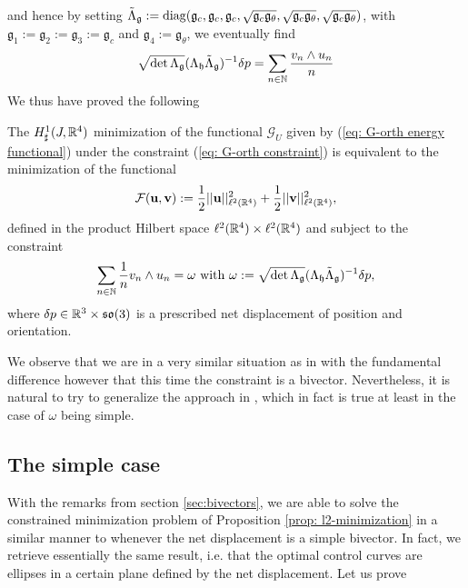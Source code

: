 and hence by setting $\tilde{\Lambda}_{\mathfrak{g}} := \operatorname{diag}(\mathfrak{g}_c, \mathfrak{g}_c, \mathfrak{g}_c, \sqrt{\mathfrak{g}_c \mathfrak{g}_{\theta}}, \sqrt{\mathfrak{g}_c \mathfrak{g}_{\theta}}, \sqrt{\mathfrak{g}_c  \mathfrak{g}_{\theta}})$, with $\mathfrak{g}_1 :=\mathfrak{g}_2 := \mathfrak{g}_3 := \mathfrak{g}_c$ and $\mathfrak{g}_4 := \mathfrak{g}_\theta$, we eventually find
\begin{equation}
\sqrt{\det \Lambda_{\mathfrak{g}}} (\Lambda_{\mathfrak{h}} \tilde{\Lambda}_{\mathfrak{g}})^{-1} \delta p = \sum_{n \in \mathbb{N}} \frac{v_n  \wedge u_n}{n}
\end{equation}
We thus have proved the following

\begin{proposition}
\label{prop: l2-minimization}
The $H_{\sharp}^1(J, \mathbb{R}^4)$ minimization of the functional $\mathcal{G}_U$ given by (\ref{eq: G-orth energy functional}) under the constraint (\ref{eq: G-orth constraint}) is equivalent to the minimization of the functional
\begin{equation}
\label{eq:l2-energy}
	\mathcal{F}(\mathbf{u}, \mathbf{v}) := \frac{1}{2} ||\mathbf{u} ||^2_{\ell^2(\mathbb{R}^4)} + \frac{1}{2} ||\mathbf{v}||^2_{\ell^2(\mathbb{R}^4)},
\end{equation}
defined in the product Hilbert space $\ell^2(\mathbb{R}^4) \times \ell^2(\mathbb{R}^4)$ and subject to the constraint
\begin{equation}
\label{eq:l2-constraint}
\sum_{n \in \mathbb{N}} \frac{1}{n} v_n \wedge u_n = \omega \text{ with } \omega := \sqrt{\det \Lambda_{\mathfrak{g}}}(\Lambda_{\mathfrak{h}} \tilde{\Lambda}_{\mathfrak{g}})^{-1} \delta p,
\end{equation}
where $\delta p \in \mathbb{R}^3 \times \mathfrak{so}(3)$ is a prescribed net displacement of position and orientation.
\end{proposition}

We observe that we are in a very similar situation as in \cite{Alouges2017} with the fundamental difference however that this time the constraint is a bivector. Nevertheless, it is natural to try to generalize the approach in \cite{Alouges2017}, which in fact is true at least in the case of $\omega$ being simple.

\subsection[The simple case]{The simple case}
With the remarks from section \ref{sec:bivectors}, we are able to solve the constrained minimization problem of Proposition \ref{prop: l2-minimization} in a similar manner to \cite{Alouges2017} whenever the net displacement is a simple bivector. In fact, we retrieve essentially the same result, i.e. that the optimal control curves are ellipses in a certain plane defined by the net displacement. Let us prove

